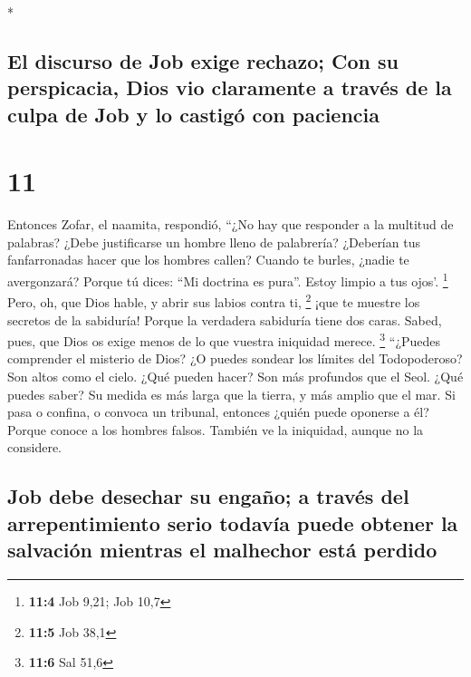 \begin{paracol}{2}
\begin{otherlanguage}{english}
\end{otherlanguage}

\switchcolumn[0]*

\hypertarget{el-discurso-de-job-exige-rechazo-con-su-perspicacia-dios-vio-claramente-a-travuxe9s-de-la-culpa-de-job-y-lo-castiguxf3-con-paciencia}{%
\subsection{El discurso de Job exige rechazo; Con su perspicacia, Dios
vio claramente a través de la culpa de Job y lo castigó con
paciencia}\label{el-discurso-de-job-exige-rechazo-con-su-perspicacia-dios-vio-claramente-a-travuxe9s-de-la-culpa-de-job-y-lo-castiguxf3-con-paciencia}}

\hypertarget{section-20}{%
\section{11}\label{section-20}}

 Entonces Zofar, el naamita, respondió, 
``¿No hay que responder a la multitud de palabras? ¿Debe justificarse un
hombre lleno de palabrería?  ¿Deberían tus fanfarronadas
hacer que los hombres callen? Cuando te burles, ¿nadie te avergonzará?
 Porque tú dices: ``Mi doctrina es pura''. Estoy limpio a
tus ojos'. \footnote{\textbf{11:4} Job 9,21; Job 10,7} 
Pero, oh, que Dios hable, y abrir sus labios contra ti, \footnote{\textbf{11:5}
  Job 38,1}  ¡que te muestre los secretos de la sabiduría!
Porque la verdadera sabiduría tiene dos caras. Sabed, pues, que Dios os
exige menos de lo que vuestra iniquidad merece. \footnote{\textbf{11:6}
  Sal 51,6}  ``¿Puedes comprender el misterio de Dios? ¿O
puedes sondear los límites del Todopoderoso?  Son altos
como el cielo. ¿Qué pueden hacer? Son más profundos que el Seol. ¿Qué
puedes saber?  Su medida es más larga que la tierra, y más
amplio que el mar.  Si pasa o confina, o convoca un
tribunal, entonces ¿quién puede oponerse a él?  Porque
conoce a los hombres falsos. También ve la iniquidad, aunque no la
considere.

\hypertarget{job-debe-desechar-su-engauxf1o-a-travuxe9s-del-arrepentimiento-serio-todavuxeda-puede-obtener-la-salvaciuxf3n-mientras-el-malhechor-estuxe1-perdido}{%
\subsection{Job debe desechar su engaño; a través del arrepentimiento
serio todavía puede obtener la salvación mientras el malhechor está
perdido}\label{job-debe-desechar-su-engauxf1o-a-travuxe9s-del-arrepentimiento-serio-todavuxeda-puede-obtener-la-salvaciuxf3n-mientras-el-malhechor-estuxe1-perdido}}


\end{paracol}
